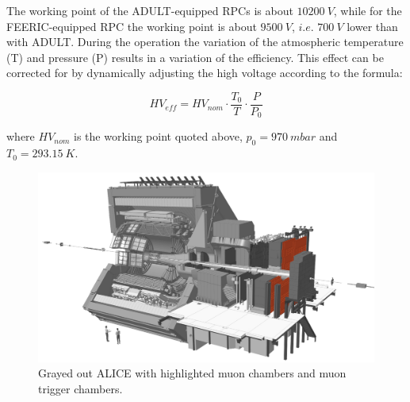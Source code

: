 The working point of the ADULT-equipped RPCs is about $10200\ V$, while for the FEERIC-equipped RPC the working point is about $9500\ V$, $i.e.$ $700\ V$ lower than with ADULT.
During the operation the variation of the atmospheric temperature (T) and pressure (P) results in a variation of the efficiency.
This effect can be corrected for by dynamically adjusting the high voltage according to the formula:

\begin{equation}
\label{eq:HVcorrection}
HV_{eff} = HV_{nom}\cdot \frac{T_0}{T} \cdot \frac{P}{P_0}
\end{equation}

where $HV_{nom}$ is the working point quoted above, $p_0 = 970\ mbar$ and $T_0 = 293.15\ K$.

\begin{figure}[!t]
\begin{center}
\includegraphics[width=\linewidth]{Chapters/Performance/Figs/ALICEmuon_MTR.pdf}
\caption{Grayed out ALICE with highlighted muon chambers and muon trigger chambers.}
\label{fig:ALICEmuon}
\end{center}
\end{figure}


